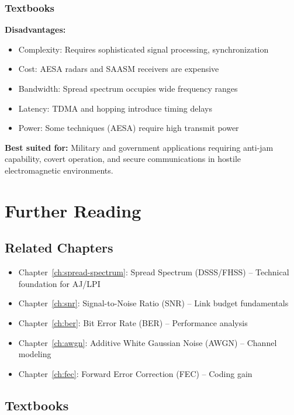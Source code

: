 \subsubsection{Textbooks}\label{textbooks}

\textbf{Disadvantages:}
\begin{itemize}
\item Complexity: Requires sophisticated signal processing, synchronization
\item Cost: AESA radars and SAASM receivers are expensive
\item Bandwidth: Spread spectrum occupies wide frequency ranges
\item Latency: TDMA and hopping introduce timing delays
\item Power: Some techniques (AESA) require high transmit power
\end{itemize}

\textbf{Best suited for:} Military and government applications requiring anti-jam capability, covert operation, and secure communications in hostile electromagnetic environments.

\section{Further Reading}

\subsection{Related Chapters}

\begin{itemize}
\item Chapter~\ref{ch:spread-spectrum}: Spread Spectrum (DSSS/FHSS) -- Technical foundation for AJ/LPI
\item Chapter~\ref{ch:snr}: Signal-to-Noise Ratio (SNR) -- Link budget fundamentals
\item Chapter~\ref{ch:ber}: Bit Error Rate (BER) -- Performance analysis
\item Chapter~\ref{ch:awgn}: Additive White Gaussian Noise (AWGN) -- Channel modeling
\item Chapter~\ref{ch:fec}: Forward Error Correction (FEC) -- Coding gain
\end{itemize}

\subsection{Textbooks}


